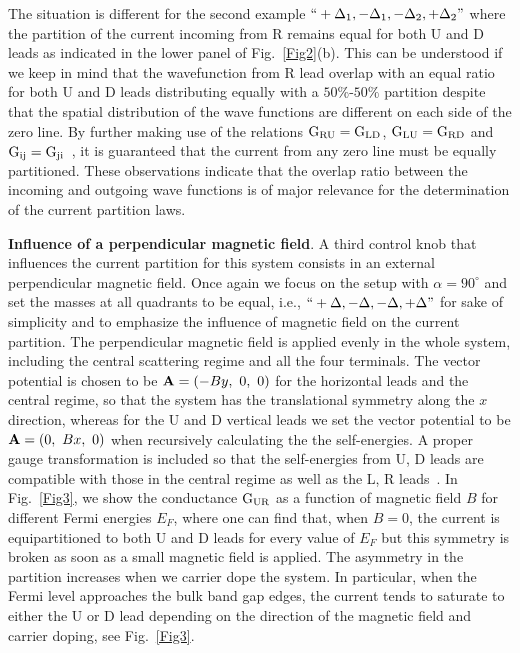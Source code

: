 \documentclass[journal=nalefd,manuscript=communication]{achemso}
\begin{document}
The situation is different for the second example $``+\Delta_1,-\Delta_1,-\Delta_2,+\Delta_2"$ where the partition of the current incoming from R remains equal for both U and D leads as indicated in the lower panel of Fig.~\ref{Fig2}(b). This can be understood if we keep in mind that the wavefunction from R lead overlap with an equal ratio for both U and D leads distributing equally with a $50\%$-$50\%$ partition despite that the spatial distribution of the wave functions are different on each side of the zero line. By further making use of the relations $\rm G_{RU}=G_{LD}$, $\rm G_{LU} = G_{RD}$ and $\rm G_{ij}=G_{ji}$~\cite{partition}, it is guaranteed that the current from any zero line must be equally partitioned. These observations indicate that the overlap ratio between the incoming and outgoing wave functions is of major relevance for the determination of the current partition laws.

\textbf{Influence of a perpendicular magnetic field}.
A third control knob that influences the current partition for this system consists in an external perpendicular magnetic field. Once again we focus on the setup with $\alpha=90^\circ$ and set the masses at all quadrants to be equal, i.e., $``+\Delta,-\Delta, -\Delta,+\Delta"$ for sake of simplicity and to emphasize the influence of magnetic field on the current partition. The perpendicular magnetic field is applied evenly in the whole system, including the central scattering regime and all the four terminals. The vector potential is chosen to be ${\bf A} = (-By,~0,~0)$ for the horizontal leads and the central regime, so that the system has the translational symmetry along the $x$ direction, whereas for the U and D vertical leads we set the vector potential to be ${\bf A} = (0,~Bx,~0)$ when recursively calculating the the self-energies. A proper gauge transformation is included so that the self-energies from U, D leads are compatible with those in the
central regime as well as the L, R leads~\cite{qiao-magneticfield}. In Fig.~\ref{Fig3}, we show the conductance $\rm G_{UR}$ as a function of magnetic field $B$ for different Fermi energies $E_F$, where one can find that, when $B=0$, the current is equipartitioned to both U and D leads for every value of $E_F$ but this symmetry is broken as soon as a small magnetic field is applied. The asymmetry in the partition increases when we carrier dope the system. In particular, when the Fermi level approaches the bulk band gap edges, the current tends to saturate to either the U or D lead depending on the direction of the magnetic field and carrier doping, see Fig.~\ref{Fig3}.
\end{document}

